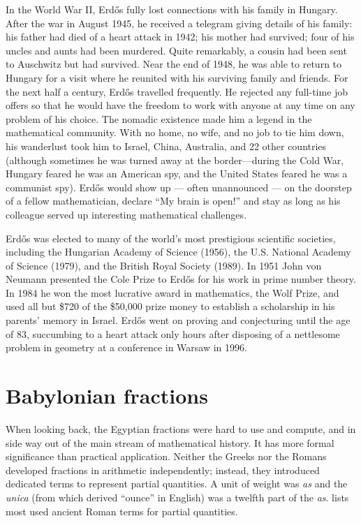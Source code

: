 \documentclass[b5paper]{article}
\begin{document}
\begin{mdframed}
In the World War II, Erdős fully lost connections with his family in Hungary. After the war in August 1945, he received a telegram giving details of his family: his father had died of a heart attack in 1942; his mother had survived; four of his uncles and aunts had been murdered. Quite remarkably, a cousin had been sent to Auschwitz but had survived. Near the end of 1948, he was able to return to Hungary for a visit where he reunited with his surviving family and friends\cite{MacTutor-Erdos-2000}. For the next half a century, Erdős travelled frequently. He rejected any full-time job offers so that he would have the freedom to work with anyone at any time on any problem of his choice. The nomadic existence made him a legend in the mathematical community. With no home, no wife, and no job to tie him down, his wanderlust took him to Israel, China, Australia, and 22 other countries (although sometimes he was turned away at the border—during the Cold War, Hungary feared he was an American spy, and the United States feared he was a communist spy). Erdős would show up — often unannounced — on the doorstep of a fellow mathematician, declare \enquote{My brain is open!} and stay as long as his colleague served up interesting mathematical challenges.

Erdős was elected to many of the world's most prestigious scientific societies, including the Hungarian Academy of Science (1956), the U.S. National Academy of Science (1979), and the British Royal Society (1989). In 1951 John von Neumann presented the Cole Prize to Erdős for his work in prime number theory. In 1984 he won the most lucrative award in mathematics, the Wolf Prize, and used all but \$720 of the \$50,000 prize money to establish a scholarship in his parents' memory in Israel. Erdős went on proving and conjecturing until the age of 83, succumbing to a heart attack only hours after disposing of a nettlesome problem in geometry at a conference in Warsaw in 1996.
\end{mdframed}

\section{Babylonian fractions}
When looking back, the Egyptian fractions were hard to use and compute, and in side way out of the main stream of mathematical history. It has more formal significance than practical application. Neither the Greeks nor the Romans developed fractions in arithmetic independently; instead, they introduced dedicated terms to represent partial quantities. A unit of weight was \emph{as} and the \emph{unica} (from which derived \enquote{ounce} in English) was a twelfth part of the \emph{as}.  lists most used ancient Roman terms for partial quantities\cite{Miller-2025}.
\end{document}
